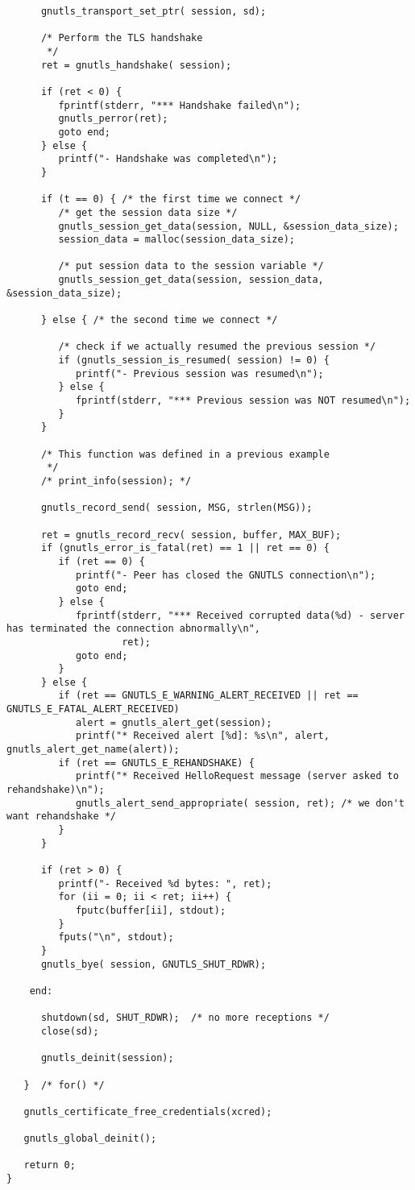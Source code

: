 \begin{verbatim}
      gnutls_transport_set_ptr( session, sd);

      /* Perform the TLS handshake
       */
      ret = gnutls_handshake( session);

      if (ret < 0) {
         fprintf(stderr, "*** Handshake failed\n");
         gnutls_perror(ret);
         goto end;
      } else {
         printf("- Handshake was completed\n");
      }

      if (t == 0) { /* the first time we connect */
         /* get the session data size */
         gnutls_session_get_data(session, NULL, &session_data_size);
         session_data = malloc(session_data_size);

         /* put session data to the session variable */
         gnutls_session_get_data(session, session_data, &session_data_size);

      } else { /* the second time we connect */

         /* check if we actually resumed the previous session */
         if (gnutls_session_is_resumed( session) != 0) {
            printf("- Previous session was resumed\n");
         } else {
            fprintf(stderr, "*** Previous session was NOT resumed\n");
         }
      }

      /* This function was defined in a previous example
       */
      /* print_info(session); */

      gnutls_record_send( session, MSG, strlen(MSG));

      ret = gnutls_record_recv( session, buffer, MAX_BUF);
      if (gnutls_error_is_fatal(ret) == 1 || ret == 0) {
         if (ret == 0) {
            printf("- Peer has closed the GNUTLS connection\n");
            goto end;
         } else {
            fprintf(stderr, "*** Received corrupted data(%d) - server has terminated the connection abnormally\n",
                    ret);
            goto end;
         }
      } else {
         if (ret == GNUTLS_E_WARNING_ALERT_RECEIVED || ret == GNUTLS_E_FATAL_ALERT_RECEIVED)
            alert = gnutls_alert_get(session);
            printf("* Received alert [%d]: %s\n", alert, gnutls_alert_get_name(alert));
         if (ret == GNUTLS_E_REHANDSHAKE) {
            printf("* Received HelloRequest message (server asked to rehandshake)\n");
            gnutls_alert_send_appropriate( session, ret); /* we don't want rehandshake */
         }
      }

      if (ret > 0) {
         printf("- Received %d bytes: ", ret);
         for (ii = 0; ii < ret; ii++) {
            fputc(buffer[ii], stdout);
         }
         fputs("\n", stdout);
      }
      gnutls_bye( session, GNUTLS_SHUT_RDWR);

    end:

      shutdown(sd, SHUT_RDWR);  /* no more receptions */
      close(sd);

      gnutls_deinit(session);

   }  /* for() */

   gnutls_certificate_free_credentials(xcred);

   gnutls_global_deinit();

   return 0;
}

\end{verbatim}
